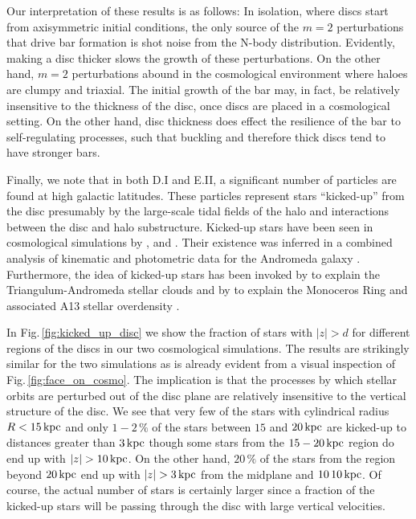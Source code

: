 Our interpretation of these results is as follows: In isolation, where
discs start from axisymmetric initial conditions, the only source of
the $m=2$ perturbations that drive bar formation is shot noise from
the N-body distribution.  Evidently, making a disc thicker slows the
growth of these perturbations.  On the other hand, $m=2$ perturbations
abound in the cosmological environment where haloes are clumpy and
triaxial.  The initial growth of the bar may, in fact, be relatively
insensitive to the thickness of the disc, once discs are placed in a
cosmological setting.  On the other hand, disc thickness does effect
the resilience of the bar to self-regulating processes, such that
buckling and therefore thick discs tend to have stronger bars.

Finally, we note that in both D.I and E.II, a significant number of
particles are found at high galactic latitudes.  These particles
represent stars ``kicked-up'' from the disc presumably by the
large-scale tidal fields of the halo and interactions between the disc
and halo substructure.  Kicked-up stars have been seen in cosmological
simulations by \citet{purcell2010}, \citet{mccarthy2012} and
\citet{tissera2013}.  Their existence was inferred in a combined
analysis of kinematic and photometric data for the Andromeda galaxy
\citep{dorman2013}.  Furthermore, the idea of kicked-up stars has been
invoked by \citep{pricewhelan2015} to explain the Triangulum-Andromeda
stellar clouds \citep{rochapinto2003, martin2014} and by
\citep{sheffield2018, laporte_2018_low_latitude} to explain the Monoceros Ring \citep{yanny2000,
  newberg_2002} and associated A13 stellar overdensity
\citep{sharma2010}.

In Fig.\,\ref{fig:kicked_up_disc} we show the fraction of stars with
$|z|>d$ for different regions of the discs in our two cosmological
simulations.  The results are strikingly similar for the two
simulations as is already evident from a visual inspection of 
Fig.\,\ref{fig:face_on_cosmo}. The implication is that
the processes by which stellar orbits are
perturbed out of the disc plane are relatively insensitive to the
vertical structure of the disc.  We see that very few of the stars
with cylindrical radius $R<15\,{\rm kpc}$ and only $1-2\,\%$ of the
stars between $15$ and $20\,{\rm kpc}$ are kicked-up to distances
greater than $3\,{\rm kpc}$ though some stars from the $15-20\,{\rm
  kpc}$ region do end up with $|z|> 10\,{\rm kpc}$.  On the other
hand, $20\,\%$ of the stars from the region beyond $20\,{\rm kpc}$ end
up with $|z|> 3\,{\rm kpc}$ from the midplane and $10\,%
10\,{\rm kpc}$.  Of course, the actual number of stars is certainly
larger since a fraction of the kicked-up stars will be passing through
the disc with large vertical velocities.

